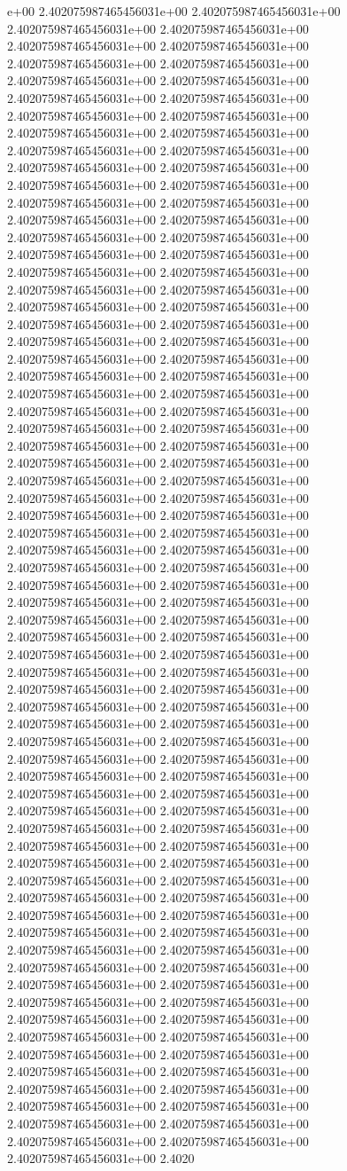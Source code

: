 e+00	2.402075987465456031e+00	2.402075987465456031e+00	2.402075987465456031e+00	2.402075987465456031e+00	2.402075987465456031e+00	2.402075987465456031e+00	2.402075987465456031e+00	2.402075987465456031e+00	2.402075987465456031e+00	2.402075987465456031e+00	2.402075987465456031e+00	2.402075987465456031e+00	2.402075987465456031e+00	2.402075987465456031e+00	2.402075987465456031e+00	2.402075987465456031e+00	2.402075987465456031e+00	2.402075987465456031e+00	2.402075987465456031e+00	2.402075987465456031e+00	2.402075987465456031e+00	2.402075987465456031e+00	2.402075987465456031e+00	2.402075987465456031e+00	2.402075987465456031e+00	2.402075987465456031e+00	2.402075987465456031e+00	2.402075987465456031e+00	2.402075987465456031e+00	2.402075987465456031e+00	2.402075987465456031e+00	2.402075987465456031e+00	2.402075987465456031e+00	2.402075987465456031e+00	2.402075987465456031e+00	2.402075987465456031e+00	2.402075987465456031e+00	2.402075987465456031e+00	2.402075987465456031e+00	2.402075987465456031e+00	2.402075987465456031e+00	2.402075987465456031e+00	2.402075987465456031e+00	2.402075987465456031e+00	2.402075987465456031e+00	2.402075987465456031e+00	2.402075987465456031e+00	2.402075987465456031e+00	2.402075987465456031e+00	2.402075987465456031e+00	2.402075987465456031e+00	2.402075987465456031e+00	2.402075987465456031e+00	2.402075987465456031e+00	2.402075987465456031e+00	2.402075987465456031e+00	2.402075987465456031e+00	2.402075987465456031e+00	2.402075987465456031e+00	2.402075987465456031e+00	2.402075987465456031e+00	2.402075987465456031e+00	2.402075987465456031e+00	2.402075987465456031e+00	2.402075987465456031e+00	2.402075987465456031e+00	2.402075987465456031e+00	2.402075987465456031e+00	2.402075987465456031e+00	2.402075987465456031e+00	2.402075987465456031e+00	2.402075987465456031e+00	2.402075987465456031e+00	2.402075987465456031e+00	2.402075987465456031e+00	2.402075987465456031e+00	2.402075987465456031e+00	2.402075987465456031e+00	2.402075987465456031e+00	2.402075987465456031e+00	2.402075987465456031e+00	2.402075987465456031e+00	2.402075987465456031e+00	2.402075987465456031e+00	2.402075987465456031e+00	2.402075987465456031e+00	2.402075987465456031e+00	2.402075987465456031e+00	2.402075987465456031e+00	2.402075987465456031e+00	2.402075987465456031e+00	2.402075987465456031e+00	2.402075987465456031e+00	2.402075987465456031e+00	2.402075987465456031e+00	2.402075987465456031e+00	2.402075987465456031e+00	2.402075987465456031e+00	2.402075987465456031e+00	2.402075987465456031e+00	2.402075987465456031e+00	2.402075987465456031e+00	2.402075987465456031e+00	2.402075987465456031e+00	2.402075987465456031e+00	2.402075987465456031e+00	2.402075987465456031e+00	2.402075987465456031e+00	2.402075987465456031e+00	2.402075987465456031e+00	2.402075987465456031e+00	2.402075987465456031e+00	2.402075987465456031e+00	2.402075987465456031e+00	2.402075987465456031e+00	2.402075987465456031e+00	2.402075987465456031e+00	2.402075987465456031e+00	2.402075987465456031e+00	2.402075987465456031e+00	2.402075987465456031e+00	2.402075987465456031e+00	2.402075987465456031e+00	2.402075987465456031e+00	2.402075987465456031e+00	2.402075987465456031e+00	2.402075987465456031e+00	2.402075987465456031e+00	2.402075987465456031e+00	2.402075987465456031e+00	2.402075987465456031e+00	2.402075987465456031e+00	2.402075987465456031e+00	2.4020